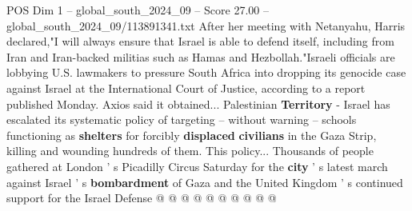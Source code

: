 \begin{textsample}{POS Dim 1 – global\_south\_2024\_09 – Score 27.00 – global\_south\_2024\_09/113891341.txt}
After her meeting with Netanyahu, Harris declared,"I will always ensure that Israel is able to defend itself, including from Iran and Iran-backed militias such as Hamas and Hezbollah."Israeli officials are lobbying U.S. lawmakers to pressure South Africa into dropping its genocide case against Israel at the International Court of Justice, according to a report published Monday.
Axios said it obtained...
Palestinian \textbf{Territory} - Israel has escalated its systematic policy of targeting -- without warning -- schools functioning as \textbf{shelters} for forcibly \textbf{displaced} \textbf{civilians} in the Gaza Strip, killing and wounding hundreds of them.
This policy...
Thousands of people gathered at London ' s Picadilly Circus Saturday for the \textbf{city} ' s latest march against Israel ' s \textbf{bombardment} of Gaza and the United Kingdom ' s continued support for the Israel Defense @ @ @ @ @ @ @ @ @ @

\end{textsample}
